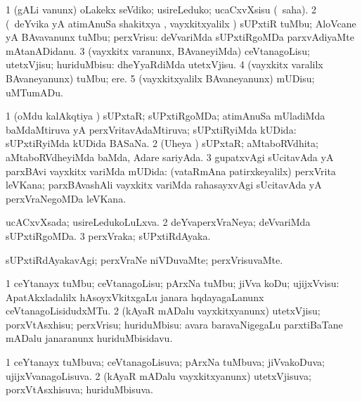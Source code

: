\bentry
{}
\gl{\sakirx}
\bmng
\bnum
\num{1} (gALi \mo vanunx) oLakekx seVdiko; usireLeduko; ucaCxvXsisu (\akirx\ saha). 
\num{2} (\kanmu\ deYvika yA atimAnuSa shakitxya \vi, vayxkitxyalilx ) sUPxtiR tuMbu; AloVcane yA BAvavanunx tuMbu; perxVrisu:  deVvariMda sUPxtiRgoMDa parxvAdiyaMte mAtanADidanu. 
\num{3} (vayxkitx \mo varanunx, BAvaneyiMda) ceVtanagoLisu; utetxVjisu; huriduMbisu:  dheYyaRdiMda utetxVjisu. 
\num{4} (vayxkitx \mo varalilx BAvaneyanunx) tuMbu; ere. 
\num{5} (vayxkitxyalilx BAvaneyanunx) mUDisu; uMTumADu. 
\enum
\emng
\eentry

\bentry
{}
\gl{\gu}
\bmng
\bnum
\num{1} (oMdu kalAkqtiya \vi) sUPxtaR; sUPxtiRgoMDa; atimAnuSa mUladiMda baMdaMtiruva yA perxVritavAdaMtiruva; sUPxtiRyiMda kUDida:  sUPxtiRyiMda kUDida BASaNa. 
\num{2} (Uheya \vi) sUPxtaR; aMtaboRVdhita; aMtaboRVdheyiMda baMda, Adare sariyAda. 
\num{3} gupatxvAgi sUcitavAda yA parxBAvi vayxkitx \mo variMda mUDida:  (vataRmAna patirxkeyalilx) perxVrita leVKana; parxBAvashAli vayxkitx \mo variMda rahasayxvAgi sUcitavAda yA perxVraNegoMDa leVKana. 
\enum
\emng
\eentry

\bentry
{}
\gl{\gu}
\bmng
ucACxvXsada; usireLedukoLuLxva. 
\bnum
\num{2} deYvaperxVraNeya; deVvariMda sUPxtiRgoMDa. 
\num{3} perxVraka; sUPxtiRdAyaka. 
\enum
\emng
\eentry

\bentry
{}
\gl{\kirxvi}
\bmng
sUPxtiRdAyakavAgi; perxVraNe niVDuvaMte; perxVrisuvaMte. 
\emng
\eentry

\bentry
{}
\gl{\sakirx}
\bmng
\bnum
\num{1} ceYtanayx tuMbu; ceVtanagoLisu; pArxNa tuMbu; jiVva koDu; ujijxVvisu:  ApatAkxladalilx hAsoyxVkitxgaLu janara hqdayagaLanunx ceVtanagoLisidudxMTu. 
\num{2} (kAyaR mADalu vayxkitxyanunx) utetxVjisu; porxVtAsxhisu; perxVrisu; huriduMbisu:  avara baravaNigegaLu parxtiBaTane mADalu janaranunx huriduMbisidavu. 
\enum
\emng
\eentry

\bentry
{}
\gl{\gu}
\bmng
\bnum
\num{1} ceYtanayx tuMbuva; ceVtanagoLisuva; pArxNa tuMbuva; jiVvakoDuva; ujijxVvanagoLisuva. 
\num{2} (kAyaR mADalu vayxkitxyanunx) utetxVjisuva; porxVtAsxhisuva; huriduMbisuva. 
\enum
\emng
\eentry

